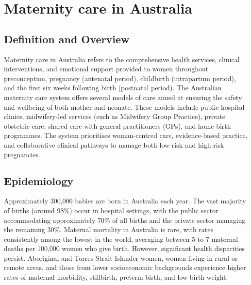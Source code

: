 \chapter{Maternity care in Australia}

\section*{Definition and Overview}
Maternity care in Australia refers to the comprehensive health services, clinical interventions, and emotional support provided to women throughout preconception, pregnancy (antenatal period), childbirth (intrapartum period), and the first six weeks following birth (postnatal period). The Australian maternity care system offers several models of care aimed at ensuring the safety and wellbeing of both mother and neonate. These models include public hospital clinics, midwifery-led services (such as Midwifery Group Practice), private obstetric care, shared care with general practitioners (GPs), and home birth programmes. The system prioritises woman-centred care, evidence-based practice, and collaborative clinical pathways to manage both low-risk and high-risk pregnancies.

\section*{Epidemiology}
Approximately 300,000 babies are born in Australia each year. The vast majority of births (around 98\%) occur in hospital settings, with the public sector accommodating approximately 70\% of all births and the private sector managing the remaining 30\%. Maternal mortality in Australia is rare, with rates consistently among the lowest in the world, averaging between 5 to 7 maternal deaths per 100,000 women who give birth. However, significant health disparities persist. Aboriginal and Torres Strait Islander women, women living in rural or remote areas, and those from lower socioeconomic backgrounds experience higher rates of maternal morbidity, stillbirth, preterm birth, and low birth weight.

